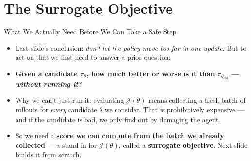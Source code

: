 \section{The Surrogate Objective}
\begin{frame}{What We Actually Need Before We Can Take a Safe Step}
\begin{itemize}
    \item Last slide's conclusion: \emph{don't let the policy move too far in one update}. But to act on that we first need to answer a prior question:
    \vspace{0.3em}
    \item[] \begin{center}\textbf{Given a candidate $\pi_\theta$, how much better or worse is it than $\pi_{\theta_\text{old}}$ --- \emph{without running it}?}\end{center}
    \vspace{0.3em}
    \item Why we can't just run it: evaluating $\mathcal{J}(\theta)$ means collecting a fresh batch of rollouts for \emph{every} candidate $\theta$ we consider. That is prohibitively expensive --- and if the candidate is bad, we only find out by damaging the agent.
    \vspace{0.3em}
    \item[$\Rightarrow$] So we need a \textbf{score we can compute from the batch we already collected} --- a stand-in for $\mathcal{J}(\theta)$, called a \textbf{surrogate objective}. Next slide builds it from scratch.
\end{itemize}
\end{frame}

